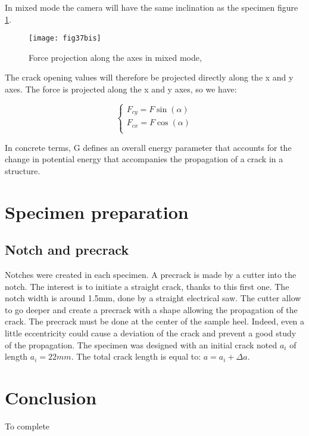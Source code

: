 In mixed mode the camera will have the same inclination as the specimen figure \ref{fig:fig37bis}.

\begin{figure}[htp]
	\centering
	\texttt{[image: fig37bis]}
	\caption{Force projection along the axes in mixed mode, \cite{Odounga2018phd}}
	\label{fig:fig37bis}
\end{figure}

The crack opening values will therefore be projected directly along the x and y axes. The force is projected along the x and y axes, so we have:


\begin{equation}
	\begin{cases}
		F_{cy}=F \sin(\alpha) \\
		F_{cx}=F \cos(\alpha) \\ 
	\end{cases}
\end{equation}

In concrete terms, G defines an overall energy parameter that accounts for the change in potential energy that accompanies the propagation of a crack in a structure.

\section{Specimen preparation}

\subsection{Notch and precrack}

Notches were created in each specimen. A precrack is made by a cutter into the notch. The interest is to initiate a straight crack, thanks to this first one. The notch width is around 1.5mm, done by a straight electrical saw. The cutter allow to go deeper and create a precrack with a shape allowing the propagation of the crack. The precrack must be done at the center of the sample heel. Indeed, even a little eccentricity could cause a deviation of the crack and prevent a good study of the propagation. The specimen was designed with an initial crack noted $a_i$ of length  $a_i=22mm$. The total crack length is equal to: $a=a_i+\Delta a$.


\section{Conclusion}

To complete


